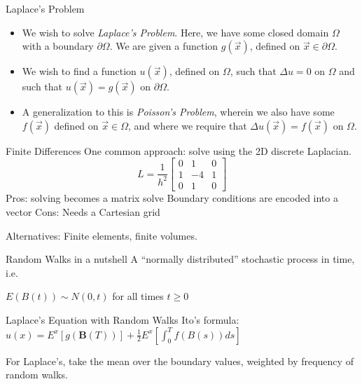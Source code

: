 \documentclass{beamer}
\newcommand\di{\partial}
\newcommand\pars[1]{\left(#1\right)}
\begin{document}
\begin{frame}{Laplace's Problem}
\begin{itemize}
\item We wish to solve \emph{Laplace's Problem}.
Here, we have some closed domain $\Omega$ with a boundary $\di\Omega$.
We are given a function $g\pars{\vec{x}}$, defined on $\vec{x}\in\di\Omega$.
\item We wish to find a function $u\pars{\vec{x}}$, defined on $\Omega$,
such that $\Delta u=0$ on $\Omega$
and such that $u\pars{\vec{x}}=g\pars{\vec{x}}$ on $\di\Omega$.
\item A generalization to this is \emph{Poisson's Problem},
wherein we also have some $f\pars{\vec{x}}$ defined on $\vec{x}\in\Omega$,
and where we require that $\Delta u\pars{\vec{x}}=f\pars{\vec{x}}$ on $\Omega$.
\end{itemize}
\end{frame}

\begin{frame}{Finite Differences}
One common approach: solve using the 2D discrete Laplacian.
	\[ L = \frac{1}{h^2} \begin{bmatrix}
		0 & 1 & 0 \\
		1 & -4& 1 \\
		0 & 1 & 0
	\end{bmatrix} \]
Pros: solving becomes a matrix solve
Boundary conditions are encoded into a vector
Cons: Needs a Cartesian grid

Alternatives: Finite elements, finite volumes.
\end{frame}
\begin{frame}{Random Walks in a nutshell}
A ``normally distributed'' stochastic process in time, i.e.

$E(B(t)) \sim N(0, t)$ for all times $t \geq 0$
\end{frame}

\begin{frame}{Laplace's Equation with Random Walks}
Ito's formula:
$u(x) = E^x[ g(\mathbf{B}(T))] + \frac{1}{2} E^x \left[ \int_0^T f(B(s))ds \right]$

For Laplace's, take the mean over the boundary values, weighted by frequency of random walks.
\end{frame}
\end{document}

